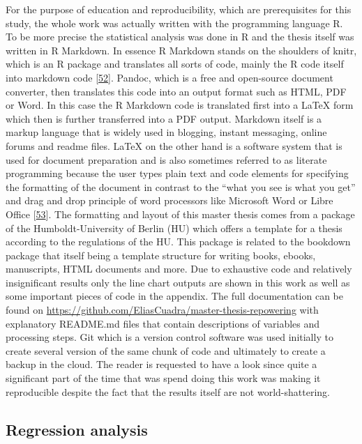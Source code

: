 \documentclass[a4paper,11pt]{article}
\begin{document}
For the purpose of education and reproducibility, which are prerequisites for this study, the whole work was actually written with the programming language R. To be more precise the statistical analysis was done in R and the thesis itself was written in R Markdown. In essence R Markdown stands on the shoulders of knitr, which is an R package and translates all sorts of code, mainly the R code itself into markdown code {[}\protect\hyperlink{ref-YihuiXieJ.J.AllaireGarrettGrolemund.2021}{52}{]}. Pandoc, which is a free and open-source document converter, then translates this code into an output format such as HTML, PDF or Word. In this case the R Markdown code is translated first into a LaTeX form which then is further transferred into a PDF output. Markdown itself is a markup language that is widely used in blogging, instant messaging, online forums and readme files. LaTeX on the other hand is a software system that is used for document preparation and is also sometimes referred to as literate programming because the user types plain text and code elements for specifying the formatting of the document in contrast to the ``what you see is what you get'' and drag and drop principle of word processors like Microsoft Word or Libre Office {[}\protect\hyperlink{ref-LaTeX.2021}{53}{]}. The formatting and layout of this master thesis comes from a package of the Humboldt-University of Berlin (HU) which offers a template for a thesis according to the regulations of the HU. This package is related to the bookdown package that itself being a template structure for writing books, ebooks, manuscripts, HTML documents and more. Due to exhaustive code and relatively insignificant results only the line chart outputs are shown in this work as well as some important pieces of code in the appendix. The full documentation can be found on \url{https://github.com/EliasCuadra/master-thesis-repowering} with explanatory README.md files that contain descriptions of variables and processing steps. Git which is a version control software was used initially to create several version of the same chunk of code and ultimately to create a backup in the cloud. The reader is requested to have a look since quite a significant part of the time that was spend doing this work was making it reproducible despite the fact that the results itself are not world-shattering.

\hypertarget{regression-analysis}{%
\subsection{Regression analysis}\label{regression-analysis}}
\end{document}
